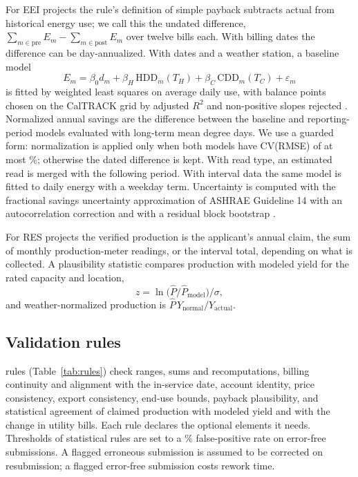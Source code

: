\documentclass[preprint,12pt]{elsarticle}
\begin{document}
For EEI projects the rule's definition of simple payback subtracts actual from historical
energy use; we call this the undated difference, $\sum_{m\in\mathrm{pre}}E_m-
\sum_{m\in\mathrm{post}}E_m$ over twelve bills each. With billing dates the difference
can be day-annualized. With dates and a weather station, a baseline model
\begin{equation}
E_m=\beta_0 d_m+\beta_H\,\mathrm{HDD}_m(T_H)+\beta_C\,\mathrm{CDD}_m(T_C)+\varepsilon_m
\label{eq:dd}
\end{equation}
is fitted by weighted least squares on average daily use, with balance points chosen on
the CalTRACK grid by adjusted $R^2$ and non-positive slopes rejected
\cite{caltrack2methods}. Normalized annual savings are the difference between the
baseline and reporting-period models evaluated with long-term mean degree days. We use a
guarded form: normalization is applied only when both models have CV(RMSE) of at most
\CfgCvrmseMax\%; otherwise the dated difference is kept. With read type, an estimated
read is merged with the following period. With interval data the same model is fitted to
daily energy with a weekday term. Uncertainty is computed with the fractional savings
uncertainty approximation of ASHRAE Guideline 14 with an autocorrelation correction
\cite{ashrae2014guideline14,reddy2000uncertainty} and with a residual block bootstrap
\cite{kunsch1989jackknife}.

For RES projects the verified production is the applicant's annual claim, the sum of
monthly production-meter readings, or the interval total, depending on what is
collected. A plausibility statistic compares production with modeled yield for the
rated capacity and location,
\begin{equation}
z=\ln\!\big(\hat P/\hat P_{\mathrm{model}}\big)/\sigma ,
\label{eq:z}
\end{equation}
and weather-normalized production is $\hat P\,Y_{\mathrm{normal}}/Y_{\mathrm{actual}}$.

\subsection{Validation rules}

\NRules{} rules (Table~\ref{tab:rules}) check ranges, sums and recomputations, billing
continuity and alignment with the in-service date, account identity, price consistency,
export consistency, end-use bounds, payback plausibility, and statistical agreement of
claimed production with modeled yield and with the change in utility bills. Each rule
declares the optional elements it needs. Thresholds of statistical rules are set to a
\StatRuleFpr\% false-positive rate on error-free submissions. A flagged erroneous
submission is assumed to be corrected on resubmission; a flagged error-free submission
costs rework time.
\end{document}
